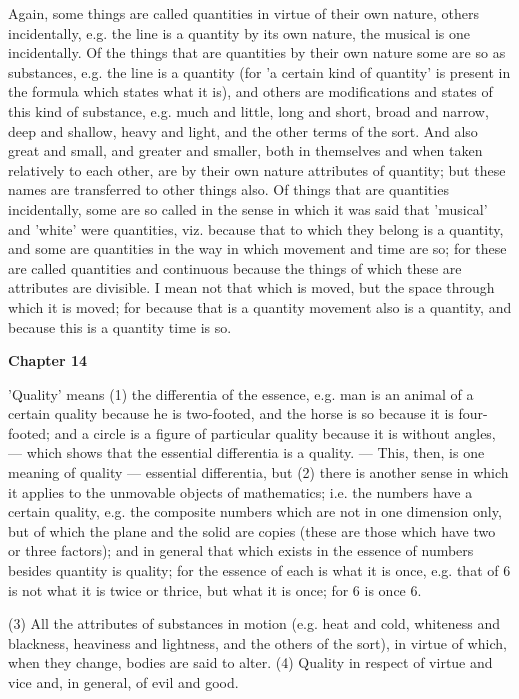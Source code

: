 Again, some things are called quantities in virtue of their own nature, others incidentally, e.g. the line is a quantity by its own nature, the musical is one incidentally. Of the things that are quantities by their own nature some are so as substances, e.g. the line is a quantity (for 'a certain kind of quantity' is present in the formula which states what it is), and others are modifications and states of this kind of substance, e.g. much and little, long and short, broad and narrow, deep and shallow, heavy and light, and the other terms of the sort. And also great and small, and greater and smaller, both in themselves and when taken relatively to each other, are by their own nature attributes of quantity; but these names are transferred to other things also. Of things that are quantities incidentally, some are so called in the sense in which it was said that 'musical' and 'white' were quantities, viz. because that to which they belong is a quantity, and some are quantities in the way in which movement and time are so; for these are called quantities and continuous because the things of which these are attributes are divisible. I mean not that which is moved, but the space through which it is moved; for because that is a quantity movement also is a quantity, and because this is a quantity time is so.

\textbf{Chapter 14}

'Quality' means (1) the differentia of the essence, e.g. man is an animal of a certain quality because he is two-footed, and the horse is so because it is four-footed; and a circle is a figure of particular quality because it is without angles, — which shows that the essential differentia is a quality. — This, then, is one meaning of quality — essential differentia, but (2) there is another sense in which it applies to the unmovable objects of mathematics; i.e. the numbers have a certain quality, e.g. the composite numbers which are not in one dimension only, but of which the plane and the solid are copies (these are those which have two or three factors); and in general that which exists in the essence of numbers besides quantity is quality; for the essence of each is what it is once, e.g. that of 6 is not what it is twice or thrice, but what it is once; for 6 is once 6.

(3) All the attributes of substances in motion (e.g. heat and cold, whiteness and blackness, heaviness and lightness, and the others of the sort), in virtue of which, when they change, bodies are said to alter. (4) Quality in respect of virtue and vice and, in general, of evil and good.

